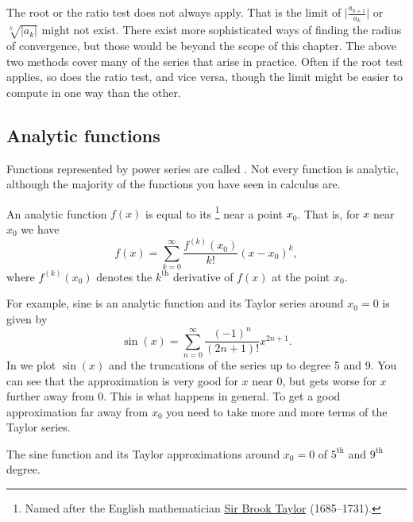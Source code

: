 The root or the ratio test does not always apply.  That is
the limit
of
$\bigl \lvert \frac{a_{k+1}}{a_k} \bigr \rvert$
or
$\sqrt[k]{\lvert a_k \rvert}$
might not exist.
There exist more sophisticated ways of finding the radius of convergence,
but those would be beyond the scope of this chapter.  The above two methods
cover many of the series that arise in practice.  Often if the root test
applies, so does the ratio test, and vice versa, though the limit might
be easier to compute in one way than the other.

\subsection{Analytic functions}

Functions represented by power series are called
\emph{}.  Not every function is analytic,
although the majority of the functions you have seen in calculus are.

An analytic function $f(x)$ is equal to its \emph{}%
\footnote{Named after the English mathematician
\href{http://en.wikipedia.org/wiki/Brook_Taylor}{Sir Brook Taylor}
(1685--1731).}
near a point $x_0$.
That is, for $x$ near $x_0$ we have
\begin{equation} \label{ps:tayloreq}
f(x) = \sum_{k=0}^\infty \frac{f^{(k)}(x_0)}{k!} {(x-x_0)}^k ,
\end{equation}
where $f^{(k)}(x_0)$ denotes the $k^{\text{th}}$ derivative of $f(x)$
at the point $x_0$.

For example, sine is an analytic function and its Taylor series
around $x_0 = 0$
is given by
\begin{equation*}
\sin(x) = \sum_{n=0}^\infty \frac{{(-1)}^n}{(2n+1)!}
 x^{2n+1} .
\end{equation*}
In  we plot $\sin(x)$ and the truncations of the
series up to degree 5 and 9.  You can see that the approximation is very
good for $x$ near 0, but gets worse for $x$ further away from 0.  This is 
what happens in general.
To get a good approximation far away from $x_0$ you
need to take more and more terms of the Taylor series.

\begin{myfig}
\capstart
{}
\caption{The sine function and its Taylor approximations
around $x_0=0$
of $5^{\text{th}}$ and $9^{\text{th}}$ degree.\label{ps:sin}}
\end{myfig}

